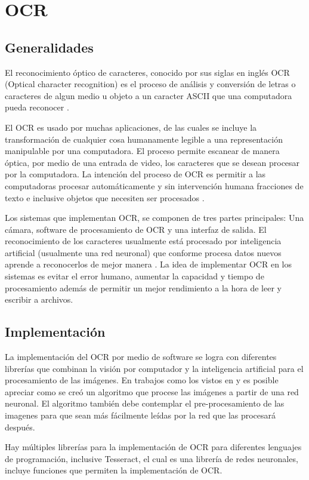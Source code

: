\section{OCR}
\subsection{Generalidades}
El reconocimiento óptico de caracteres, conocido por sus siglas en inglés OCR (Optical character recognition) es el proceso de análisis y conversión de letras o caracteres de algun medio u objeto a un caracter ASCII que una computadora pueda reconocer \cite{nallasamy}.
\par
El OCR es usado por muchas aplicaciones, de las cuales se incluye la transformación de cualquier cosa humanamente legible a una representación manipulable por una computadora. El proceso permite escanear de manera óptica, por medio de una entrada de video, los caracteres que se desean procesar por la computadora. La intención del proceso de OCR es permitir a las computadoras procesar automáticamente y sin intervención humana fracciones de texto e inclusive objetos que necesiten ser procesados \cite{Shah2009}.
\par
Los sistemas que implementan OCR, se componen de tres partes principales: Una cámara, software de procesamiento de OCR y una interfaz de salida. El reconocimiento de los caracteres usualmente está procesado por inteligencia artificial (usualmente una red neuronal) que conforme procesa datos nuevos aprende a reconocerlos de mejor manera \cite{Shah2009}. La idea de implementar OCR en los sistemas es evitar el error humano, aumentar la capacidad y tiempo de procesamiento además de permitir un mejor rendimiento a la hora de leer y escribir a archivos. 

\subsection{Implementación}
La implementación del OCR por medio de software se logra con diferentes librerías que combinan la visión por computador y la inteligencia artificial para el procesamiento de las imágenes. En trabajos como los vistos en \cite{nallasamy} y \cite{Shah2009} es posible apreciar como se creó un algoritmo que procese las imágenes a partir de una red neuronal. El algoritmo también debe contemplar el pre-procesamiento de las imagenes para que sean más fácilmente leídas por la red que las procesará después.
\par
Hay múltiples librerías para la implementación de OCR para diferentes lenguajes de programación, inclusive Tesseract, el cual es una librería de redes neuronales, incluye funciones que permiten la implementación de OCR.

